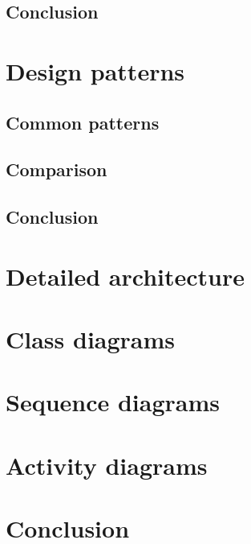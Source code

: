 \subsection{Conclusion}

\section{Design patterns}
\subsection{Common patterns}
\subsection{Comparison}
\subsection{Conclusion}

\section{Detailed architecture}
\section{Class diagrams}
\section{Sequence diagrams}
\section{Activity diagrams}

\section{Conclusion}